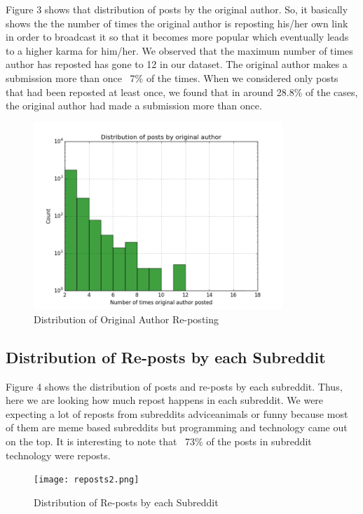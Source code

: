 \documentclass{article} %
\begin{document}
Figure 3 shows that distribution of posts by the original author. So, it basically shows the the number of times the original author is reposting his/her own link in order to broadcast it so that it becomes more popular which eventually leads to a higher karma for him/her. We observed that the maximum number of times author has reposted has gone to 12 in our dataset.
The original author makes a submission more than once  ~7\% of the times. When we considered only posts that had been reposted at least once, we found that in around 28.8\% of the cases, the original author had made a submission more than once. 
\begin{figure}[h]
\begin{center}
\includegraphics[width=3.7in]{original_author.png}
\caption{Distribution of Original Author Re-posting}
\end{center}
\end{figure}

\newpage

\subsection{Distribution of Re-posts by each Subreddit}

Figure 4 shows the distribution of posts and re-posts by each subreddit. Thus, here we are looking how much repost happens in each subreddit. We were expecting a lot of reposts from subreddits adviceanimals or funny because most of them are meme based subreddits but programming and technology came out on the top. 
It is interesting to note that ~73\% of the posts in subreddit technology were reposts. 

\begin{figure}[h]
\begin{center}
\texttt{[image: reposts2.png]}
\caption{Distribution of Re-posts by each Subreddit}
\end{center}
\end{figure}
\end{document}

